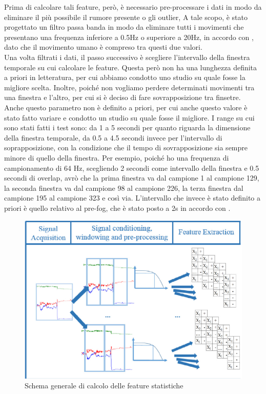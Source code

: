 Prima di calcolare tali feature, però, è necessario pre-processare i dati in modo da eliminare il più possibile il rumore presente o gli outlier,  A tale scopo, è stato progettato un filtro passa banda in modo da eliminare tutti i movimenti che presentano una frequenza inferiore a 0.5Hz o superiore a 20Hz, in accordo con \cite{21}, dato che il movimento umano è compreso tra questi due valori.\\
Una volta filtrati i dati, il passo successivo è scegliere l'intervallo della finestra temporale su cui calcolare le feature. Questa però non ha una lunghezza definita a priori in letteratura, per cui abbiamo condotto uno studio su quale fosse la migliore scelta. Inoltre, poiché non vogliamo perdere determinati movimenti tra una finestra e l'altro, per cui si è deciso di fare sovrapposizione tra finsetre. Anche questo parametro non è definito a priori, per cui anche questo valore è stato fatto variare e condotto un studio su quale fosse il migliore. I range su cui sono stati fatti i test sono: da 1 a 5 secondi per quanto riguarda la dimensione della finestra temporale, da 0.5 a 4.5 secondi invece per l'intervallo di soprapposizione, con la condizione che il tempo di sovrapposizione sia sempre minore di quello della finestra. Per esempio, poiché ho una frequenza di campionamento di 64 Hz, scegliendo 2 secondi come intervallo della finestra e 0.5 secondi di overlap, avrò che la prima finestra va dal campione 1 al campione 129, la seconda finestra va dal campione 98 al campione 226, la terza finestra dal campione 195 al campione 323 e così via. L'intervallo che invece è stato definito a priori è quello relativo al pre-fog, che è stato posto a 2s in accordo con \cite{12}.
\begin{figure}[h!]
	\centering
	\includegraphics[scale=0.6]{images/flusso_feature.png}
	\caption{Schema generale di calcolo delle feature statistiche}
	\label{Flusso Feature}
\end{figure}
